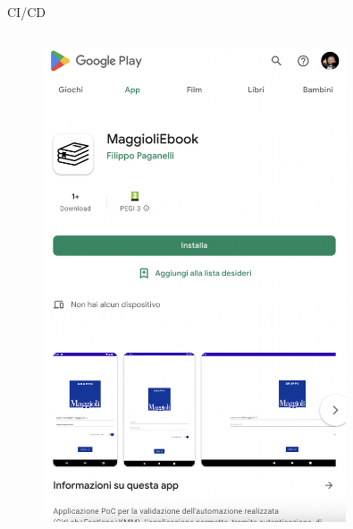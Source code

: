 \begin{frame}{CI/CD}
\begin{columns}[onlytextwidth]
\begin{column}{0.5\textwidth}
\begin{figure}[H]
                \includegraphics[width=0.8\textwidth]{img/Screenshot 2022-09-28 at 15.06.56.png}
                \end{figure}
            \end{column}
        \end{columns}
    \end{frame}

